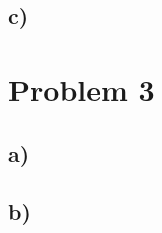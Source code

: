 \documentclass[a4paper, 11pt]{article}
\begin{document}

\subsection{c)} %



\section{Problem 3} %
\label{sec:problem_3}

\subsection{a)} %


\subsection{b)} %
\end{document}

